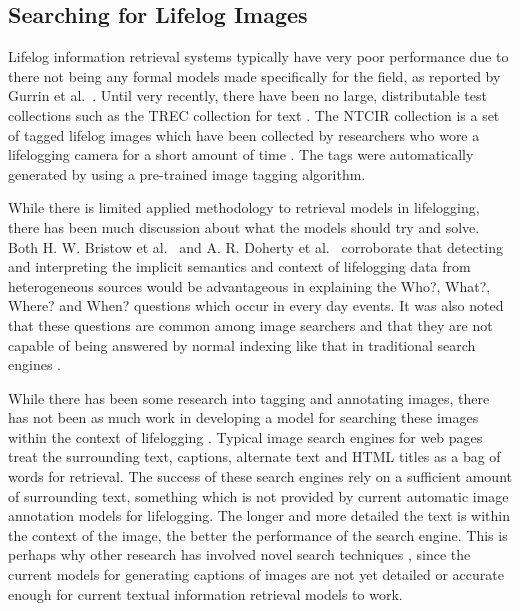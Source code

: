 \documentclass[12pt,a4paper]{article}
\begin{document}
\subsection{Searching for Lifelog Images}
Lifelog information retrieval systems typically have very poor performance due to there not being any formal models made specifically for the field, as reported by Gurrin et al.~\citep{gurrin2014lifelogging}. Until very recently, there have been no large, distributable test collections such as the TREC collection for text \citep{gurrin2014lifelogging}. The NTCIR collection is a set of tagged lifelog images which have been collected by researchers who wore a lifelogging camera for a short amount of time \citep{gurrin2016ntcir}. The tags were automatically generated by using a pre-trained image tagging algorithm.

While there is limited applied methodology to retrieval models in lifelogging, there has been much discussion about what the models should try and solve. Both H.  W.  Bristow et al.~\citep{bristow2004defining} and A. R. Doherty et al.~\cite{doherty2010automatically} corroborate that detecting and interpreting the implicit semantics and context of lifelogging data from heterogeneous sources would be advantageous in explaining the Who?, What?, Where? and When? questions which occur in every day events. It was also noted that these questions are common among image searchers and that they are not capable of being answered by normal indexing like that in traditional search engines \citep{ali2010semantically}.

While there has been some research into tagging and annotating images, there has not been as much work in developing a model for searching these images within the context of lifelogging \citep{gurrin2014lifelogging}. Typical image search engines for web pages treat the surrounding text, captions, alternate text and HTML titles \citep{frankel1996webseer} as a bag of words for retrieval. The success of these search engines rely on a sufficient amount of surrounding text, something which is not provided by current automatic image annotation models for lifelogging. The longer and more detailed the text is within the context of the image, the better the performance of the search engine. This is perhaps why other research has involved novel search techniques \citep{vuurpij2002vind}, since the current models for generating captions of images are not yet detailed or accurate enough for current textual information retrieval models to work.
\end{document}

